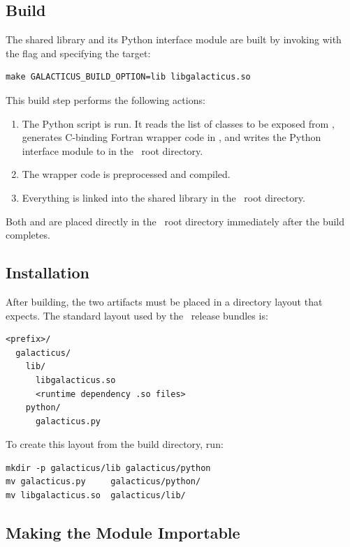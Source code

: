 \subsection{Build}\label{sec:pythonInterface:build:build}

The shared library and its Python interface module are built by invoking  with the  flag and specifying the  target:
\begin{verbatim}
make GALACTICUS_BUILD_OPTION=lib libgalacticus.so
\end{verbatim}
This build step performs the following actions:
\begin{enumerate}
  \item The Python script  is run. It reads the list of classes to be exposed from , generates C-binding Fortran wrapper code in , and writes the Python interface module to  in the \glc\ root directory.
  \item The wrapper code is preprocessed and compiled.
  \item Everything is linked into the shared library  in the \glc\ root directory.
\end{enumerate}
Both  and  are placed directly in the \glc\ root directory immediately after the build completes.

\subsection{Installation}\label{sec:pythonInterface:build:install}

After building, the two artifacts must be placed in a directory layout that  expects. The standard layout used by the \glc\ release bundles is:
\begin{verbatim}
<prefix>/
  galacticus/
    lib/
      libgalacticus.so
      <runtime dependency .so files>
    python/
      galacticus.py
\end{verbatim}
To create this layout from the build directory, run:
\begin{verbatim}
mkdir -p galacticus/lib galacticus/python
mv galacticus.py     galacticus/python/
mv libgalacticus.so  galacticus/lib/
\end{verbatim}

\subsection{Making the Module Importable}\label{sec:pythonInterface:build:pythonpath}

